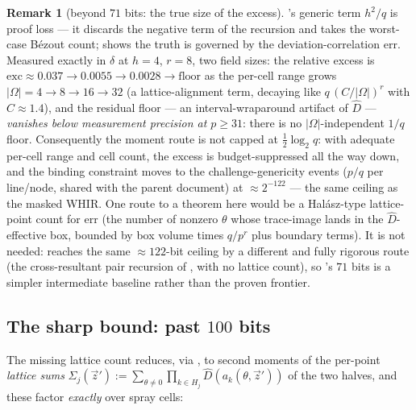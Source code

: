 \documentclass{article}
\theoremstyle{definition}
\newtheorem{remark}[theorem]{Remark}
\begin{document}
\begin{remark}[beyond $71$ bits: the true size of the excess]\label{rem:beyond}
's generic term $h^2/q$ is proof loss --- it discards the negative term of the recursion and takes the worst-case B\'ezout count;  shows the truth is governed by the deviation-correlation $\mathrm{err}$. Measured exactly in $\delta$ at $h = 4$, $r = 8$, two field sizes: the relative excess is $\mathrm{exc} \approx 0.037 \to 0.0055 \to 0.0028 \to \mathrm{floor}$ as the per-cell range grows $|\Omega| = 4 \to 8 \to 16 \to 32$ (a lattice-alignment term, decaying like $q\,(C/|\Omega|)^r$ with $C \approx 1.4$), and the residual floor --- an interval-wraparound artifact of $\hat{D}$ --- \emph{vanishes below measurement precision at $p \geq 31$}: there is no $|\Omega|$-independent $1/q$ floor. Consequently the moment route is not capped at $\tfrac12\log_2 q$: with adequate per-cell range and cell count, the excess is budget-suppressed all the way down, and the binding constraint moves to the challenge-genericity events ($p/q$ per line/node, shared with the parent document) at $\approx 2^{-122}$ --- the same ceiling as the masked WHIR. One route to a theorem here would be a Hal\'asz-type lattice-point count for $\mathrm{err}$ (the number of nonzero $\theta$ whose trace-image lands in the $\hat D$-effective box, bounded by box volume times $q/p^r$ plus boundary terms). It is not needed:  reaches the same $\approx 122$-bit ceiling by a different and fully rigorous route (the cross-resultant pair recursion of , with no lattice count), so 's $71$ bits is a simpler intermediate baseline rather than the proven frontier.
\end{remark}

\subsection{The sharp bound: past $100$ bits}\label{sec:sharp}

The missing lattice count reduces, via , to second moments of the per-point \emph{lattice sums} $\Sigma_j(\vec z') := \sum_{\theta \neq 0} \prod_{k \in H_j} \hat D(a_k(\theta, \vec z'))$ of the two halves, and these factor \emph{exactly} over spray cells:
\end{document}
